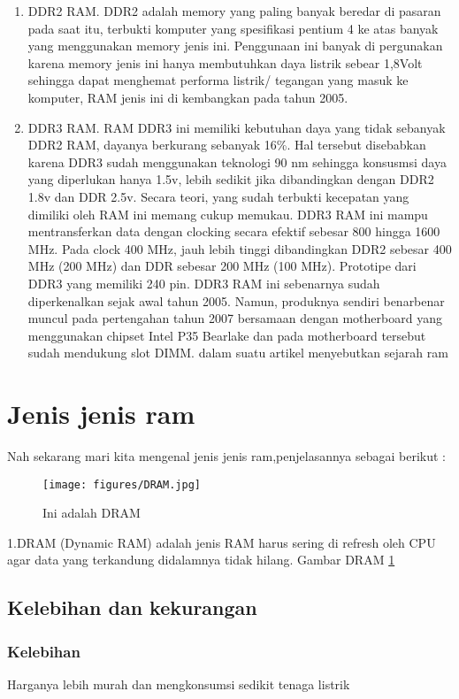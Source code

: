 \begin{enumerate}
\item DDR2 RAM. DDR2 adalah memory yang paling banyak beredar di pasaran pada saat itu, terbukti komputer yang spesifikasi pentium 4 ke atas banyak yang menggunakan memory jenis ini. Penggunaan ini banyak di pergunakan karena memory jenis ini hanya membutuhkan daya listrik sebear 1,8Volt sehingga dapat menghemat performa listrik/ tegangan yang masuk ke komputer, RAM jenis ini di kembangkan pada tahun 2005.

\item DDR3 RAM. RAM DDR3 ini memiliki kebutuhan daya yang tidak sebanyak DDR2 RAM, dayanya berkurang sebanyak 16\%. Hal tersebut disebabkan karena DDR3 sudah menggunakan teknologi 90 nm sehingga konsusmsi daya yang diperlukan hanya 1.5v, lebih sedikit jika dibandingkan dengan DDR2 1.8v dan DDR 2.5v. Secara teori, yang sudah terbukti kecepatan yang dimiliki oleh RAM ini memang cukup memukau. DDR3 RAM ini mampu mentransferkan data dengan clocking secara efektif sebesar 800 hingga 1600 MHz. Pada clock 400 MHz, jauh lebih tinggi dibandingkan DDR2 sebesar 400 MHz (200 MHz) dan DDR sebesar 200 MHz (100 MHz). Prototipe dari DDR3 yang memiliki 240 pin. DDR3 RAM ini sebenarnya sudah diperkenalkan sejak awal tahun 2005. Namun, produknya sendiri benar\-benar muncul pada pertengahan tahun 2007 bersamaan dengan motherboard yang menggunakan chipset Intel P35 Bearlake dan pada motherboard tersebut sudah mendukung slot DIMM.
dalam suatu artikel menyebutkan sejarah ram \cite{kan1995random}
\end{enumerate}

\section{Jenis \- jenis ram}
Nah sekarang mari kita mengenal jenis \- jenis ram,penjelasannya sebagai berikut :


  \begin{figure}[ht]
  \centerline{\texttt{[image: figures/DRAM.jpg]}}
  \caption{Ini adalah DRAM}
  \label{DRAM}
  \end{figure}

1.DRAM (Dynamic RAM) adalah jenis RAM harus sering di refresh oleh CPU agar data yang terkandung didalamnya tidak hilang.
  Gambar DRAM \ref{DRAM}
  \subsection{Kelebihan dan kekurangan}
    \subsubsection{Kelebihan}
    \-Harganya lebih murah dan mengkonsumsi sedikit tenaga listrik
